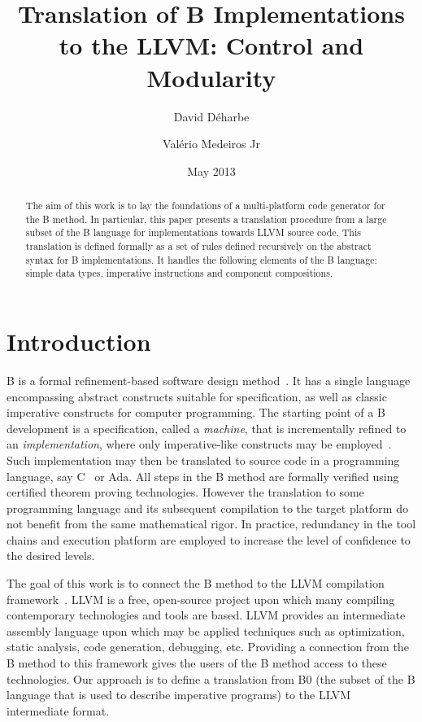\documentclass{llncs}
\title{Translation of B Implementations to the LLVM: Control and Modularity}
\author{David Déharbe \and Valério Medeiros Jr}
\institute{Program of Graduate Studies in Systems and Computing (PPgSC) \\
  Federal University of Rio Grande do Norte \\
  Natal (Brazil)}
\date{May 2013}
\begin{document}
\maketitle

\begin{abstract}
  The aim of this work is to lay the foundations of a multi-platform code
  generator for the B method. In particular, this paper presents a translation
  procedure from a large subset of the B language for implementations towards
  LLVM source code. This translation is defined formally as a set of rules
  defined recursively on the abstract syntax for B implementations. It handles
  the following elements of the B language: simple data types, imperative
  instructions and component compositions. 
\end{abstract}

\section{Introduction}

B is a formal refinement-based software design method~\cite{Abrial1996}. It has
a single language encompassing abstract constructs suitable for specification,
as well as classic imperative constructs for computer programming. The starting
point of a B development is a specification, called a \emph{machine}, that is
incrementally refined to an \emph{implementation}, where only imperative-like
constructs may be employed~\cite{Clearsy}. Such implementation may then be
translated to source code in a programming language, say C~\cite{ComenC} or
Ada. All steps in the B method are formally verified using certified theorem
proving technologies. However the translation to some programming language and
its subsequent compilation to the target platform do not benefit from the same
mathematical rigor. In practice, redundancy in the tool chains and execution
platform are employed to increase the level of confidence to the desired levels.

The goal of this work is to connect the B method to the LLVM compilation
framework~\cite{Lattner04LLVM}.  LLVM is a free, open-source project upon which
many compiling contemporary technologies and tools are based. LLVM provides an
intermediate assembly language upon which may be applied techniques such as
optimization, static analysis, code generation, debugging, etc. Providing a
connection from the B method to this framework gives the users of the B method
access to these technologies. Our approach is to define a translation from B0
(the subset of the B language that is used to describe imperative programs) to
the LLVM intermediate format.
\end{document}
